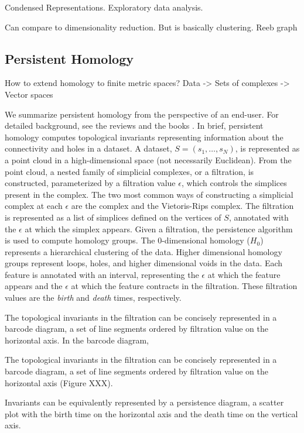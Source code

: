 Condensed Representations.
Exploratory data analysis.

Can compare to dimensionality reduction.
But is basically clustering.
Reeb graph


\subsection{Persistent Homology}
\label{subsec:persistent_homology}

How to extend homology to finite metric spaces?
Data -> Sets of complexes -> Vector spaces

We summarize persistent homology from the perspective of an end-user.
For detailed background, see the reviews \cite{Carlsson:2009a,Ghrist:2008} and the books \cite{Edelsbrunner:2010,Zomorodian:2005b}.
In brief, persistent homology computes topological invariants representing information about the connectivity and holes in a dataset.
A dataset, $S=(s_{1},\ldots,s_{N})$, is represented as a point cloud in a high-dimensional space (not necessarily Euclidean).
From the point cloud, a nested family of simplicial complexes, or a filtration, is constructed, parameterized by a filtration value $\epsilon$, which controls the simplices present in the complex.
The two most common ways of constructing a simplicial complex at each $\epsilon$ are the \Cech complex and the Vietoris-Rips complex.
The filtration is represented as a list of simplices defined on the vertices of $S$, annotated with the $\epsilon$ at which the simplex appears.
Given a filtration, the persistence algorithm is used to compute homology groups.
The $0$-dimensional homology ($H_0$) represents a hierarchical clustering of the data.
Higher dimensional homology groups represent loops, holes, and higher dimensional voids in the data.
Each feature is annotated with an interval, representing the $\epsilon$ at which the feature appears and the $\epsilon$ at which the feature contracts in the filtration.
These filtration values are the \emph{birth} and \emph{death} times, respectively.

The topological invariants in the filtration can be concisely represented in a barcode diagram, a set of line segments ordered by filtration value on the horizontal axis.
In the barcode diagram,

The topological invariants in the filtration can be concisely represented in a barcode diagram, a set of line segments ordered by filtration value on the horizontal axis (Figure XXX).

Invariants can be equivalently represented by a persistence diagram, a scatter plot with the birth time on the horizontal axis and the death time on the vertical axis.

